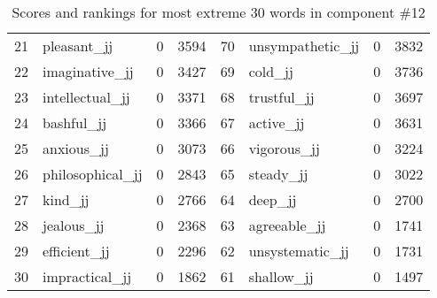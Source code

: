 \begin{table}[tbp]
\begin{tabular}{| rlr@{.}l | rlr@{.}l |}
    21 & pleasant\_jj & 0 & 3594    &    70 & unsympathetic\_jj & 0 & 3832 \\
    22 & imaginative\_jj & 0 & 3427    &    69 & cold\_jj & 0 & 3736 \\
    23 & intellectual\_jj & 0 & 3371    &    68 & trustful\_jj & 0 & 3697 \\
    24 & bashful\_jj & 0 & 3366    &    67 & active\_jj & 0 & 3631 \\
    25 & anxious\_jj & 0 & 3073    &    66 & vigorous\_jj & 0 & 3224 \\
    26 & philosophical\_jj & 0 & 2843    &    65 & steady\_jj & 0 & 3022 \\
    27 & kind\_jj & 0 & 2766    &    64 & deep\_jj & 0 & 2700 \\
    28 & jealous\_jj & 0 & 2368    &    63 & agreeable\_jj & 0 & 1741 \\
    29 & efficient\_jj & 0 & 2296    &    62 & unsystematic\_jj & 0 & 1731 \\
    30 & impractical\_jj & 0 & 1862    &    61 & shallow\_jj & 0 & 1497 \\
    \hline
    \end{tabular}
    \caption{Scores and rankings for most extreme 30 words in component \#12} 
\end{table}
\clearpage
